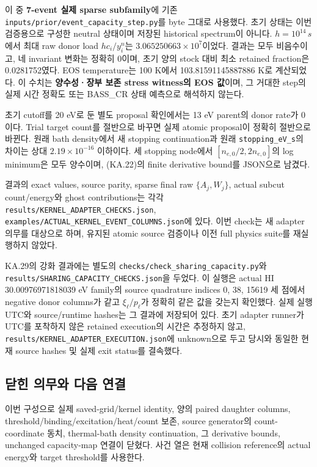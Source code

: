 \documentclass[11pt,a4paper]{article}
\begin{document}
이 중 \textbf{7-event 실제 sparse subfamily}에 기존 \nolinkurl{inputs/prior/event_capacity_step.py}를 byte 그대로 사용했다. 초기 상태는 이번 검증용으로 구성한 neutral 상태이며 저장된 historical spectrum이 아니다. \(h=10^{14}\,s\)에서 최대 raw donor load \(hc_i/y_i^n\)는 \(3.065250663\times10^7\)이었다. 결과는 모두 비음수이고, 네 invariant 변화는 정확히 0이며, 초기 양의 stock 대비 최소 retained fraction은 0.0281752였다. EOS temperature는 100 K에서 103.81591145887886 K로 계산되었다. 이 수치는 \textbf{양수성·장부 보존 stress witness의 EOS 값}이며, 그 거대한 step의 실제 시간 정확도 또는 BASS\_CR 상태 예측으로 해석하지 않는다.

초기 cutoff를 20 eV로 둔 별도 proposal 확인에서는 13 eV parent의 donor rate가 0이다. Trial target count를 절반으로 바꾸면 실제 atomic proposal이 정확히 절반으로 바뀐다. 원래 bath density에서 새 stopping continuation과 원래 \texttt{stopping\_eV\_s}의 차이는 상대 \(2.19\times10^{-16}\) 이하이다. 세 stopping node에서 \([n_{e,0}/2,2n_{e,0}]\)의 log minimum은 모두 양수이며, (KA.22)의 finite derivative bound를 JSON으로 남겼다.

결과의 exact values, source parity, sparse final raw \(\{A_j,W_j\}\), actual subcut count/energy와 ghost contributions는 각각 \nolinkurl{results/KERNEL_ADAPTER_CHECKS.json}, \nolinkurl{examples/ACTUAL_KERNEL_EVENT_COLUMNS.json}에 있다. 이번 check는 새 adapter 의무를 대상으로 하며, 유지된 atomic source 검증이나 이전 full physics suite를 재실행하지 않았다.

KA.29의 강화 결과에는 별도의 \nolinkurl{checks/check_sharing_capacity.py}와 \nolinkurl{results/SHARING_CAPACITY_CHECKS.json}을 두었다. 이 실행은 actual HI 30.00976971818039 eV family의 source quadrature indices 0, 38, 15619 세 점에서 negative donor columns가 같고 \(\xi_\ell/p_\ell\)가 정확히 같은 값을 갖는지 확인했다. 실제 실행 UTC와 source/runtime hashes는 그 결과에 저장되어 있다. 초기 adapter runner가 UTC를 포착하지 않은 retained execution의 시간은 추정하지 않고, \nolinkurl{results/KERNEL_ADAPTER_EXECUTION.json}에 unknown으로 두고 당시와 동일한 현재 source hashes 및 실제 exit status를 결속했다.

\hypertarget{uxb2ebuxd78c-uxc758uxbb34uxc640-uxb2e4uxc74c-uxc5f0uxacb0}{%
\subsection{닫힌 의무와 다음 연결}\label{uxb2ebuxd78c-uxc758uxbb34uxc640-uxb2e4uxc74c-uxc5f0uxacb0}}

이번 구성으로 실제 saved-grid/kernel identity, 양의 paired daughter columns, threshold/binding/excitation/heat/count 보존, source generator의 count-coordinate 동치, thermal-bath density continuation, 그 derivative bounds, unchanged capacity-map 연결이 닫혔다. 사건 열은 현재 collision reference의 actual energy와 target threshold를 사용한다.
\end{document}
